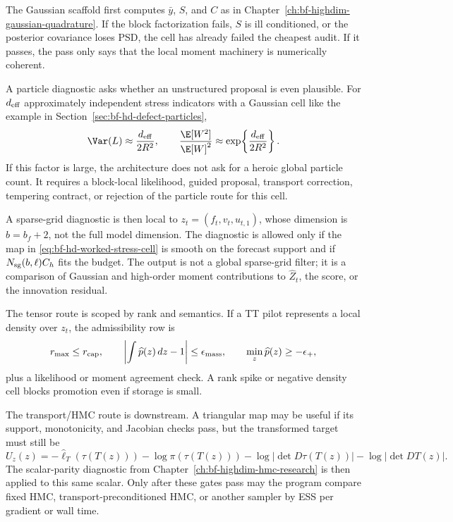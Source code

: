 The Gaussian scaffold first computes \(\bar y\), \(S\), and \(C\) as in
Chapter~\ref{ch:bf-highdim-gaussian-quadrature}.  If the block factorization
fails, \(S\) is ill conditioned, or the posterior covariance loses PSD, the
cell has already failed the cheapest audit.  If it passes, the pass only says
that the local moment machinery is numerically coherent.

A particle diagnostic asks whether an unstructured proposal is even plausible.
For \(d_{\rm eff}\) approximately independent stress indicators with a
Gaussian cell like the example in Section~\ref{sec:bf-hd-defect-particles},
\[
  \Var(L)\approx \frac{d_{\rm eff}}{2R^2},
  \qquad
  \frac{\E[W^2]}{\E[W]^2}\approx
  \exp\!\left\{\frac{d_{\rm eff}}{2R^2}\right\}.
  \label{eq:bf-hd-worked-pf-factor}
\]
If this factor is large, the architecture does not ask for a heroic global
particle count.  It requires a block-local likelihood, guided proposal,
transport correction, tempering contract, or rejection of the particle route
for this cell.

A sparse-grid diagnostic is then local to \(z_t=(f_t,v_t,u_{t,1})\), whose
dimension is \(b=b_f+2\), not the full model dimension.  The diagnostic is
allowed only if the map in \eqref{eq:bf-hd-worked-stress-cell} is smooth on the
forecast support and if \(N_{\rm sg}(b,\ell)C_h\) fits the budget.  The output
is not a global sparse-grid filter; it is a comparison of Gaussian and
high-order moment contributions to \(\widehat Z_t\), the score, or the
innovation residual.

The tensor route is scoped by rank and semantics.  If a TT pilot represents a
local density over \(z_t\), the admissibility row is
\[
  r_{\max}\le r_{\rm cap},\qquad
  \left|\int \widehat p(z)\,dz-1\right|\le \epsilon_{\rm mass},\qquad
  \min_z \widehat p(z)\ge -\epsilon_+,
  \label{eq:bf-hd-worked-tt-gate}
\]
plus a likelihood or moment agreement check.  A rank spike or negative density
cell blocks promotion even if storage is small.

The transport/HMC route is downstream.  A triangular map may be useful if its
support, monotonicity, and Jacobian checks pass, but the transformed target
must still be
\[
  U_z(z)=-\widehat\ell_T(\tau(T(z)))-\log\pi(\tau(T(z)))
        -\log|\det D\tau(T(z))|-\log|\det DT(z)|.
  \label{eq:bf-hd-worked-hmc-target}
\]
The scalar-parity diagnostic from Chapter~\ref{ch:bf-highdim-hmc-research} is
then applied to this same scalar.  Only after these gates pass may the program
compare fixed HMC, transport-preconditioned HMC, or another sampler by ESS per
gradient or wall time.

